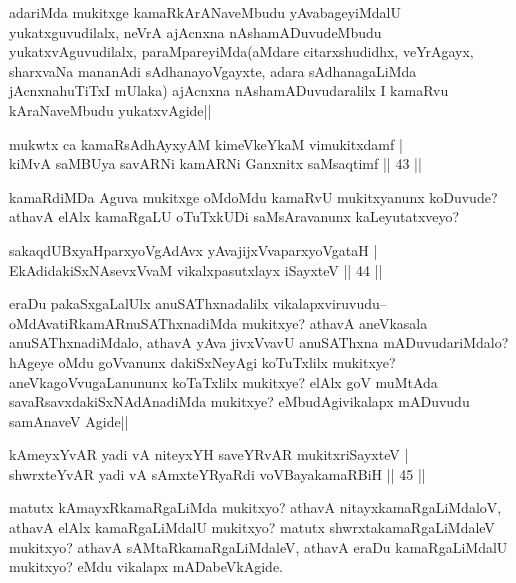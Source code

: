 \begin{artha}
adariMda mukitxge kamaRkArANaveMbudu yAvabageyiMdalU yukatxguvudilalx, neVrA ajAcnxna nAshamADuvudeMbudu yukatxvAguvudilalx, paraMpareyiMda(aMdare citarxshudidhx, veYrAgayx, sharxvaNa mananAdi sAdhanayoVgayxte, adara sAdhanagaLiMda jAcnxnahuTiTxI mUlaka) ajAcnxna nAshamADuvudaralilx I kamaRvu kAraNaveMbudu yukatxvAgide||
\end{artha}


\begin{shl}
mukwtx ca kamaRsAdhAyxyAM kimeVkeYkaM vimukitxdamf |\\
kiMvA saMBUya savARNi kamARNi Ganxnitx saMsaqtimf \hfill || 43 ||
\end{shl}

\begin{artha}
kamaRdiMDa Aguva mukitxge oMdoMdu kamaRvU mukitxyanunx koDuvude? athavA elAlx kamaRgaLU oTuTxkUDi saMsAravanunx kaLeyutatxveyo?
\end{artha}

\begin{shl}
sakaqdUBxyaHparxyoVgAdAvx yAvajijxVvaparxyoVgataH |\\
EkAdidakiSxNAsevxVvaM vikalxpasutxlayx iSayxteV \hfill || 44 ||
\end{shl}

\begin{artha}
eraDu pakaSxgaLalUlx anuSAThxnadalilx vikalapxviruvudu-- oMdAvatiRkamARnuSAThxnadiMda mukitxye? athavA aneVkasala anuSAThxnadiMdalo, athavA yAva jivxVvavU anuSAThxna mADuvudariMdalo? hAgeye oMdu goVvanunx dakiSxNeyAgi koTuTxlilx mukitxye? aneVkagoVvugaLanununx  koTaTxlilx mukitxye? elAlx goV muMtAda savaRsavxdakiSxNAdAnadiMda mukitxye? eMbudAgivikalapx mADuvudu samAnaveV Agide||
\end{artha}

\begin{shl}
kAmeyxYvAR yadi vA niteyxYH saveYRvAR mukitxriSayxteV |\\
shwrxteYvAR yadi vA sAmxteYRyaRdi voVBayakamaRBiH \hfill || 45 ||
\end{shl}

\begin{artha}
matutx kAmayxRkamaRgaLiMda mukitxyo? athavA nitayxkamaRgaLiMdaloV, athavA elAlx kamaRgaLiMdalU mukitxyo? matutx shwrxtakamaRgaLiMdaleV mukitxyo? athavA sAMtaRkamaRgaLiMdaleV, athavA eraDu kamaRgaLiMdalU mukitxyo? eMdu vikalapx mADabeVkAgide. 
\end{artha}

